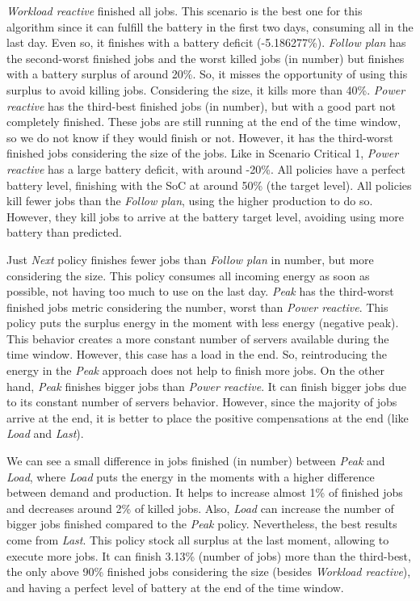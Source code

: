 \emph{Workload reactive} finished all jobs. This scenario is the best one for this algorithm since it can fulfill the battery in the first two days, consuming all in the last day. Even so, it finishes with a battery deficit (-5.186277\%). \emph{Follow plan} has the second-worst finished jobs and the worst killed jobs (in number) but finishes with a battery surplus of around 20\%. So, it misses the opportunity of using this surplus to avoid killing jobs. Considering the size, it kills more than 40\%. \emph{Power reactive} has the third-best finished jobs (in number), but with a good part not completely finished. These jobs are still running at the end of the time window, so we do not know if they would finish or not. However, it has the third-worst finished jobs considering the size of the jobs. Like in Scenario Critical 1, \emph{Power reactive} has a large battery deficit, with around -20\%. All policies have a perfect battery level, finishing with the SoC at around 50\% (the target level). All policies kill fewer jobs than the \emph{Follow plan}, using the higher production to do so. However, they kill jobs to arrive at the battery target level, avoiding using more battery than predicted.

Just \emph{Next} policy finishes fewer jobs than \emph{Follow plan} in number, but more considering the size. This policy consumes all incoming energy as soon as possible, not having too much to use on the last day. \emph{Peak} has the third-worst finished jobs metric considering the number, worst than \emph{Power reactive}. This policy puts the surplus energy in the moment with less energy (negative peak). This behavior creates a more constant number of servers available during the time window. However, this case has a load in the end. So, reintroducing the energy in the \emph{Peak} approach does not help to finish more jobs. On the other hand, \emph{Peak} finishes bigger jobs than \emph{Power reactive}. It can finish bigger jobs due to its constant number of servers behavior. However, since the majority of jobs arrive at the end, it is better to place the positive compensations at the end (like \emph{Load} and \emph{Last}).

We can see a small difference in jobs finished (in number) between \emph{Peak} and \emph{Load}, where \emph{Load} puts the energy in the moments with a higher difference between demand and production. It helps to increase almost 1\% of finished jobs and decreases around 2\% of killed jobs. Also, \emph{Load} can increase the number of bigger jobs finished compared to the \emph{Peak} policy. Nevertheless, the best results come from \emph{Last}. This policy stock all surplus at the last moment, allowing to execute more jobs. It can finish 3.13\% (number of jobs) more than the third-best, the only above 90\% finished jobs considering the size (besides \emph{Workload reactive}), and having a perfect level of battery at the end of the time window.

